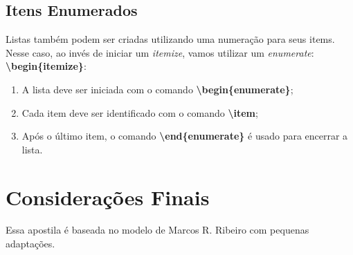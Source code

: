 \documentclass{apostila}
\begin{document}
\section{Itens Enumerados}

Listas também podem ser criadas utilizando uma numeração para seus items. Nesse caso, ao invés de iniciar um \textit{itemize}, vamos utilizar um \textit{enumerate}: \textbf{\textbackslash begin\{itemize\}}:
\begin{enumerate}
 \item A lista deve ser iniciada com o comando \textbf{\textbackslash begin\{enumerate\}};
 \item Cada item deve ser identificado com o comando \textbf{\textbackslash item};
 \item Após o último item, o comando \textbf{\textbackslash end\{enumerate\}} é usado para encerrar a lista.
\end{enumerate}


\chapter{Considerações Finais}

Essa apostila é baseada no modelo de Marcos R. Ribeiro \cite{marcos:site} com pequenas adaptações.

\postextual

\nocite{araujo:2016:abntex2}
\nocite{marcos:site}

\end{document}
